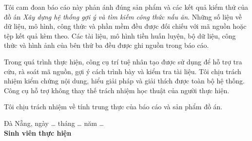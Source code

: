 \begin{declaration}

Tôi cam đoan báo cáo này phản ánh đúng sản phẩm và các kết quả kiểm thử của
đồ án \emph{Xây dựng hệ thống gợi ý và tìm kiếm công thức nấu ăn}. Những số
liệu về dữ liệu, mô hình, công thức và phần mềm đều được đối chiếu với mã
nguồn hoặc tệp kết quả kèm theo. Các tài liệu, mô hình tiền huấn luyện, bộ dữ
liệu, công thức và hình ảnh của bên thứ ba đều được ghi nguồn trong báo cáo.

Trong quá trình thực hiện, công cụ trí tuệ nhân tạo được sử dụng để hỗ trợ
tra cứu, rà soát mã nguồn, gợi ý cách trình bày và kiểm tra tài liệu. Tôi chịu
trách nhiệm kiểm chứng nội dung, hiểu giải pháp và giải thích được toàn bộ hệ
thống. Công cụ hỗ trợ không thay thế trách nhiệm học thuật của người thực hiện.

Tôi chịu trách nhiệm về tính trung thực của báo cáo và sản phẩm đồ án.

\vspace{2cm}
\begin{flushright}
Đà Nẵng, ngày \ldots{} tháng \ldots{} năm \ldots{}\\[1.5cm]
\textbf{Sinh viên thực hiện}\\[1.5cm]
\textbf{\dauSinhVien}
\end{flushright}

\end{declaration}
